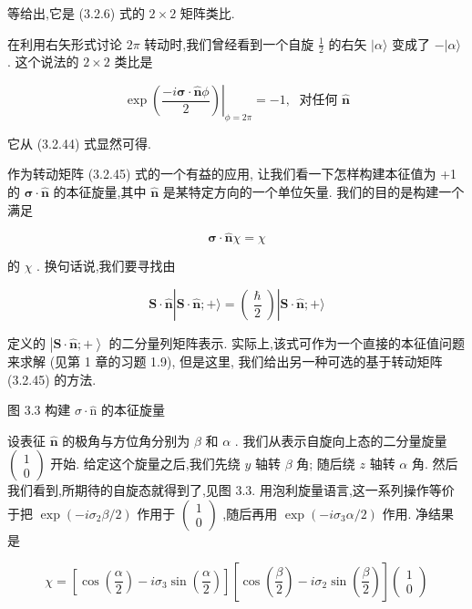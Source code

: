 等给出,它是 (3.2.6) 式的 $2 \times 2$ 矩阵类比.

在利用右矢形式讨论 ${2\pi }$ 转动时,我们曾经看到一个自旋 $\frac{1}{2}$ 的右矢 $|\alpha \rangle$ 变成了 $- |\alpha \rangle$ . 这个说法的 $2 \times 2$ 类比是

$$
{\left. \exp \left( \frac{-i\mathbf{\sigma } \cdot \widehat{\mathbf{n}}\phi }{2}\right) \right| }_{\phi = {2\pi }} = - 1,\;\text{ 对任何 }\widehat{\mathbf{n}}
$$

它从 (3.2.44) 式显然可得.

作为转动矩阵 (3.2.45) 式的一个有益的应用, 让我们看一下怎样构建本征值为 +1 的 $\mathbf{\sigma } \cdot \widehat{\mathbf{n}}$ 的本征旋量,其中 $\widehat{\mathbf{n}}$ 是某特定方向的一个单位矢量. 我们的目的是构建一个满足

$$
\mathbf{\sigma } \cdot \widehat{\mathbf{n}}\chi = \chi 
$$

的 $\chi$ . 换句话说,我们要寻找由

$$
\mathbf{S} \cdot \widehat{\mathbf{n}}\left| {\mathbf{S} \cdot \widehat{\mathbf{n}}; + \rangle = \left( \frac{\hslash }{2}\right) }\right| \mathbf{S} \cdot \widehat{\mathbf{n}}; + \rangle 
$$

定义的 $\left| {\mathbf{S} \cdot \widehat{\mathbf{n}}; + }\right\rangle$ 的二分量列矩阵表示. 实际上,该式可作为一个直接的本征值问题来求解 (见第 1 章的习题 1.9), 但是这里, 我们给出另一种可选的基于转动矩阵 (3.2.45) 的方法.


图 3.3 构建 $\sigma \cdot \widehat{\mathrm{n}}$ 的本征旋量

设表征 $\widehat{\mathbf{n}}$ 的极角与方位角分别为 $\beta$ 和 $\alpha$ . 我们从表示自旋向上态的二分量旋量 $\left( \begin{array}{l} 1 \\ 0 \end{array}\right)$ 开始. 给定这个旋量之后,我们先绕 $y$ 轴转 $\beta$ 角; 随后绕 $z$ 轴转 $\alpha$ 角. 然后我们看到,所期待的自旋态就得到了,见图 3.3. 用泡利旋量语言,这一系列操作等价于把 $\exp \left( {-i{\sigma }_{2}\beta /2}\right)$ 作用于 $\left( \begin{array}{l} 1 \\ 0 \end{array}\right)$ ,随后再用 $\exp \left( {-i{\sigma }_{3}\alpha /2}\right)$ 作用. 净结果是

$$
\chi = \left\lbrack {\cos \left( \frac{\alpha }{2}\right) - i{\sigma }_{3}\sin \left( \frac{\alpha }{2}\right) }\right\rbrack \left\lbrack {\cos \left( \frac{\beta }{2}\right) - i{\sigma }_{2}\sin \left( \frac{\beta }{2}\right) }\right\rbrack \left( \begin{array}{l} 1 \\ 0 \end{array}\right)
$$

